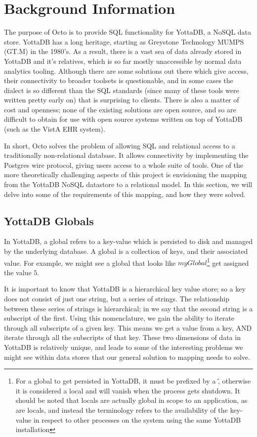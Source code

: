 \documentclass[]{article}
\begin{document}
\section{Background Information}

The purpose of Octo is to provide SQL functionality for YottaDB, a NoSQL data store.
YottaDB has a long heritage, starting as Greystone Technology MUMPS (GT.M) in the 1980's.
As a result, there is a vast sea of data already stored in YottaDB and it's relatives, which is so far mostly unaccessible by normal data analytics tooling.
Although there are some solutions out there which give access, their connectivity to broader toolsets is questionable, and in some cases the dialect is so different than the SQL standards (since many of these tools were written pretty early on) that is surprising to clients.
There is also a matter of cost and openness; none of the existing solutions are open source, and so are difficult to obtain for use with open source systems written on top of YottaDB (such as the VistA EHR system).

In short, Octo solves the problem of allowing SQL and relational access to a traditionally non-relational database.
It allows connectivity by implementing the Postgres wire protocol, giving users access to a whole suite of tools.
One of the more theoretically challenging aspects of this project is envisioning the mapping from the YottaDB NoSQL datastore to a relational model.
In this section, we will delve into some of the requirements of this mapping, and how they were solved.

\subsection{YottaDB Globals}

In YottaDB, a global refers to a key-value which is persisted to disk and managed by the underlying database.
A global is a collection of keys, and their associated value.
For example, we might see a global that looks like $myGlobal$\footnote{For a global to get persisted in YottaDB, it must be prefixed by a \^, otherwise it is considered a local and will vanish when the process gets shutdown. It should be noted that locals are actually global in scope to an application, as are locals, and instead the terminology refers to the availability of the key-value in respect to other processes on the system using the same YottaDB installation} get assigned the value $5$.

It is important to know that YottaDB is a hierarchical key value store; so a key does not consist of just one string, but a series of strings.
The relationship between these series of strings is hierarchical; in we say that the second string is a subscript of the first.
Using this nomenclature, we gain the ability to iterate through all subscripts of a given key.
This means we get a value from a key, AND iterate through all the subscripts of that key.
These two dimensions of data in YottaDB is relatively unique, and leads to some of the interesting problems we might see within data stores that our general solution to mapping needs to solve.
\end{document}
